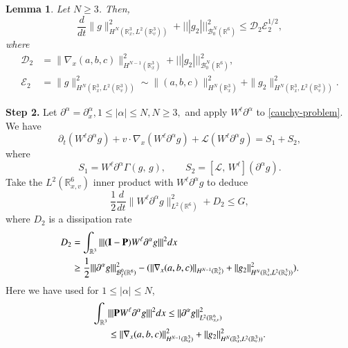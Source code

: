 \documentclass{amsart}[12pt, article]
\newtheorem{lemm}[theo]{Lemma}
\begin{document}
\begin{lemm} Let $ N\ge 3$. Then,
\begin{equation}\label{microenergy11}
\frac{d}{dt}\| g\|^2_{H^N({{{\mathbb R}}}^3_x, L^2({{{\mathbb R}}}^3_v))}+
|||  g_2 |||^2_{{{\mathcal B}}^N_0({{{\mathbb R}}}^6)}\le
\mathcal{D}_2\mathcal{E}_2^{{1/2}},
\end{equation}
where
\begin{align*}
\mathcal{D}_2&=
\|\nabla_x(a,b,c)\|_{H^{N-1}({{{\mathbb R}}}^3_x)}^2+|||g_2|||_{{{\mathcal B}}^{N}_0({{{\mathbb R}}}^6)}^2,
\\
\mathcal{E}_2&=\|g\|_{H^{N}({{{\mathbb R}}}^3_x, L^2({{{\mathbb R}}}^3_v))}^2\sim
\|(a,b,c)\|^2_{H^{N}({{{\mathbb R}}}^3_x)}+\|g_2\|_{H^{N}({{{\mathbb R}}}^3_x, L^2({{{\mathbb R}}}^3_v))}^2.
\end{align*}
\vspace{0.5cm}
\end{lemm}
\noindent
{\bf Step 2.} Let
$
{{\partial}}^\alpha={{\partial}}^\alpha_x, 1\le |\alpha|\le N, N\ge 3,
$
and apply $W^\ell{{\partial}}^\alpha$ to \eqref{cauchy-problem}.
We have
\begin{equation}\label{g1-cauchy-problem}
 {{\partial}}_t (W^\ell{{\partial}}^\alpha g)+ v\cdot\nabla_x
(W^\ell{{\partial}}^\alpha g) + {{\mathcal L}} (W^\ell{{\partial}}^\alpha g)=S_1+S_2,
\end{equation}
where
\[
S_1=W^\ell{{\partial}}^\alpha\Gamma(g,\, g),
\qquad
S_2=[{{\mathcal L}},\, W^\ell ]({{\partial}}^\alpha g).
\]
Take the $L^2({{{\mathbb R}}}^6_{x, v})$ inner product with $W^\ell{{\partial}}^\alpha g$ to deduce
\begin{equation*}
\frac 12 \frac{d}{dt}\|W^\ell{{\partial}}^\alpha g\|^2_{L^2({{{\mathbb R}}}^6)}+D_2\le G,
\end{equation*}
where $D_2$ is a dissipation rate
\begin{align*}
 D_2&=\int_{{{{\mathbb R}}}^3}||| ({{\bf I}}-{{\bf P}})W^\ell{{\partial}}^\alpha g |||^2dx
\\&\ge \frac 12||| {{\partial}}^\alpha g |||^2_{{{\mathcal B}}^{0}_\ell({{{\mathbb R}}}^6)}-
(\|\nabla_x (a,b,c)\|_{H^{N-1}({{{\mathbb R}}}^3_x)}+|| g_2 ||^2_{H^N({{{\mathbb R}}}^3_x, L^2({{{\mathbb R}}}^3_v))}).
\end{align*}
Here we have used for $1\le |\alpha|\le N$,
\begin{align*}
\int_{{{{\mathbb R}}}^3}&|||{{\bf P}} W^\ell{{\partial}}^\alpha g|||^2 dx
\le ||{{\partial}}^\alpha g||_{L^2({{{\mathbb R}}}^6_{x, v})}^2
\\&\le
 \|\nabla_x (a,b,c)\|^2_{H^{N-1}({{{\mathbb R}}}^3_x)}+||g_2 ||^2_{H^N({{{\mathbb R}}}^3_x, L^2({{{\mathbb R}}}^3_v))}.
\end{align*}
\end{document}
